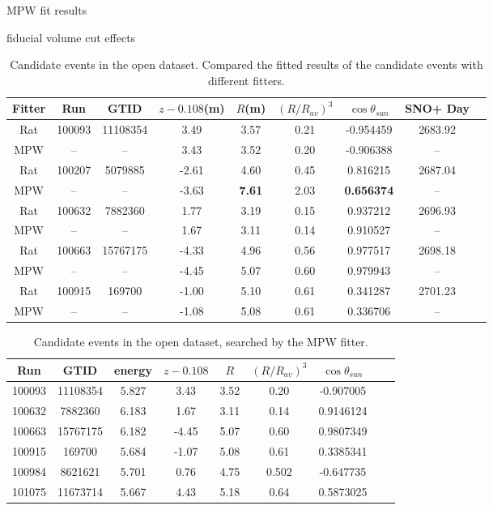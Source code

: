MPW fit results

fiducial volume cut effects

\begin{table}[ht]
	\centering
	\caption{Candidate events in the open dataset. Compared the fitted results of the candidate events with different fitters.}
	\label{opendata}
	\begin{tabular*}{150mm}{c@{\extracolsep{\fill}}cccccccc}
		\toprule
	 Fitter &	Run &  GTID &  $z-0.108$(m) & $R$(m)& $(R/R_{av})^3$ & $\cos\theta_{sun}$ & SNO+ Day\\
		\hline 
	Rat & 100093 &11108354 &3.49 &3.57 &0.21 &-0.954459 &2683.92 \\	
	MPW &  --& --& 3.43 &	3.52 &	0.20	& -0.906388 & --\\
	Rat &	100207 &5079885 &-2.61 &4.60 &0.45 &0.816215 &2687.04\\
	MPW &	 --& --& -3.63 & \textbf{7.61} &	2.03 & \textbf{0.656374} & -- \\
	Rat &100632 &7882360 &1.77 &3.19 &0.15 &0.937212 &2696.93\\
	 MPW &    --& --&  1.67 & 3.11 &	0.14 & 0.910527 & -- \\
	Rat &100663 &15767175 &-4.33& 4.96 &0.56 &0.977517 &2698.18\\
	MPW & --& -- &-4.45 &	5.07 &	0.60 &	0.979943 & -- \\
	Rat &100915 &169700 &-1.00 &5.10 &0.61 &0.341287 &2701.23\\
	MPW &	--& --& -1.08 &	5.08 &	0.61 &	0.336706 & -- \\	
		\bottomrule
	\end{tabular*}
\end{table}

\begin{table}[ht]
	\centering
	\caption{Candidate events in the open dataset, searched by the MPW fitter.}
	\label{opendataMPW}
	\begin{tabular*}{150mm}{c@{\extracolsep{\fill}}cccccccc}
		\toprule
		Run & GTID & energy & $z-0.108$ & $R$ & $(R/R_{av})^3$ & $\cos\theta_{sun}$\\
		\hline 
100093 &	11108354	&5.827 & 3.43 & 3.52 & 0.20 & -0.907005\\
100632&	7882360    &6.183& 1.67 &3.11 &0.14 &0.9146124\\
100663&	15767175   &	6.182 & -4.45 &5.07 &0.60&	0.9807349\\
100915&	169700   &	5.684 &	-1.07 &5.08 &0.61&0.3385341\\
100984&	8621621&	5.701 & 0.76 &4.75 &0.502&-0.647735\\
101075&	11673714&	5.667 &4.43 &5.18 &0.64& 0.5873025\\

		\bottomrule
\end{tabular*}
\end{table}

